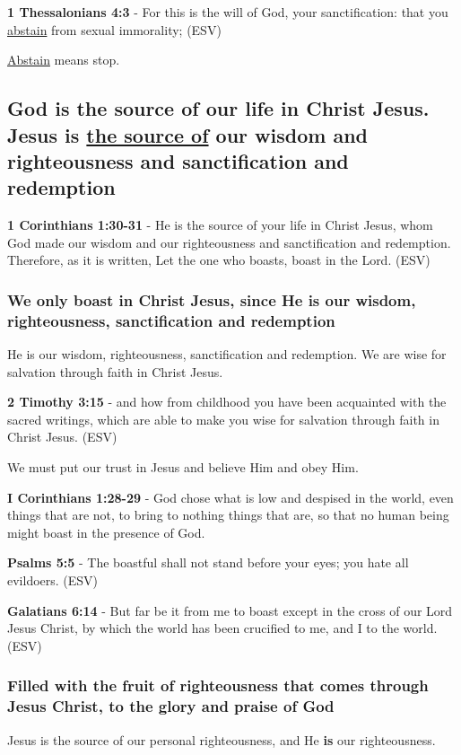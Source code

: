 \documentclass[11pt]{article}
\begin{document}
\textbf{1 Thessalonians 4:3} -  For this is the will of God, your sanctification: that you \uline{abstain} from sexual immorality;  (ESV)

\uline{Abstain} means stop.

\subsection{God is the source of our life in Christ Jesus. Jesus is \underline{the source of} our wisdom and righteousness and sanctification and redemption}
\label{sec:org7f7055f}
\textbf{1 Corinthians 1:30-31} -  He is the source of your life in Christ Jesus, whom God made our wisdom and our righteousness and sanctification and redemption.  Therefore, as it is written, Let the one who boasts, boast in the Lord.  (ESV)

\subsubsection{We only boast in Christ Jesus, since He is our wisdom, righteousness, sanctification and redemption}
\label{sec:orge6c4e0d}
He is our wisdom, righteousness, sanctification and redemption.
We are wise for salvation through faith in Christ Jesus.

\textbf{2 Timothy 3:15} -  and how from childhood you have been acquainted with the sacred writings, which are able to make you wise for salvation through faith in Christ Jesus.  (ESV)

We must put our trust in Jesus and believe Him and obey Him.

\textbf{I Corinthians 1:28-29} - God chose what is low and despised in the world, even things that are not, to bring to nothing things that are, so that no human being might boast in the presence of God.

\textbf{Psalms 5:5} -  The boastful shall not stand before your eyes; you hate all evildoers.  (ESV)

\textbf{Galatians 6:14} -  But far be it from me to boast except in the cross of our Lord Jesus Christ, by which the world has been crucified to me, and I to the world.  (ESV)

\subsubsection{Filled with the fruit of righteousness that comes through Jesus Christ, to the glory and praise of God}
\label{sec:org3b2501c}
Jesus is the source of our personal righteousness, and He \textbf{is} our righteousness.
\end{document}
